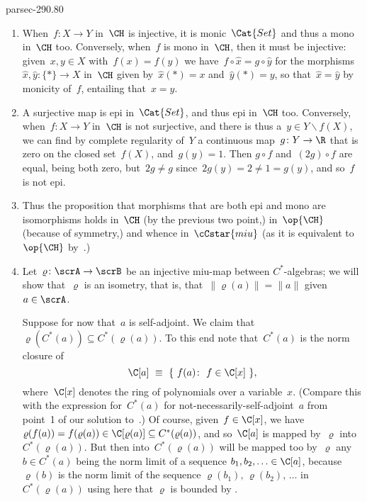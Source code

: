 \documentclass[b5page]{book}
\begin{document}
\begin{solution}{parsec-290.80}
\begin{enumerate}
\item
When~$f\colon X\to Y$ in~$\CH$ is injective,
it is monic~$\Cat{Set}$ and thus a mono in~$\CH$ too.
Conversely,
when~$f$ is mono in~$\CH$,
then it must be injective:
given~$x,y\in X$
with~$f(x)=f(y)$
we have~$f\circ \hat{x}=g\circ \hat{y}$
for the morphisms $\hat{x},\hat{y}\colon \{\ast\}\to X$
in~$\CH$
given by~$\hat{x}(\ast)=x$ and~$\hat{y}(\ast)=y$,
so that~$\hat{x}=\hat{y}$
by monicity of~$f$,
entailing that~$x=y$.
\item
A surjective map is epi in~$\Cat{Set}$, and thus epi in~$\CH$ too.
Conversely, 
when~$f\colon X\to Y$ in~$\CH$ is not surjective,
and there is thus a~$y\in Y\backslash f(X)$,
we can find by complete regularity of~$Y$
a continuous map~$g\colon Y\to \R$ 
that is zero on
the closed set~$f(X)$,
and~$g(y)=1$.
Then $g\circ f$ and~$(2g)\circ f$ are equal,
being both zero,
but~$2g\neq g$
since~$2g(y)=2\neq 1=g(y)$,
and so~$f$ is not epi.
\item
Thus the proposition
that morphisms that are both epi and mono are isomorphisms
holds
in~$\CH$ (by the previous two point,)
in~$\op{\CH}$ (because of symmetry,)
and whence in~$\cCstar{miu}$ (as
it is
equivalent to $\op{\CH}$ by~.)
\item
\label{S29VIII3}
Let~$\varrho\colon \scrA\to\scrB$
be an injective miu-map between $C^*$-algebras;
we will show that~$\varrho$ is an isometry,
that is, 
that~$\|\varrho(a)\|=\|a\|$ given~$a\in \scrA$.

Suppose for now that~$a$ is self-adjoint.
We claim that~$\varrho(C^*(a))\subseteq C^*(\varrho(a))$.
To this end note
that~$C^*(a)$
is the norm closure
of
$$\C[a]\ \equiv\  \{\ f(a)\colon \ f\in\C[x]\ \},$$
where~$\C[x]$ denotes the ring of polynomials over a variable~$x$.
(Compare this with the expression for~$C^*(a)$
for not-necessarily-self-adjoint~$a$ from 
point~1 of our solution to~.)
Of course, given~$f\in \C[x]$,
we have~$\varrho(f(a))=f(\varrho(a))\in \C[\varrho(a)]\subseteq
C^*(\varrho(a))$,
and so~$\C[a]$ is mapped by~$\varrho$ into~$C^*(\varrho(a))$.
But then into~$C^*(\varrho(a))$
will be mapped too
by~$\varrho$
any~$b\in C^*(a)$ being the norm limit
of a sequence $b_1,b_2,\dotsc\in \C[a]$,
because $\varrho(b)$
is the norm limit of
the sequence 
$\varrho(b_1),\,\varrho(b_2),\,\dotsc$ in $C^*(\varrho(a))$
using here that $\varrho$ is bounded by .


\end{enumerate}
\end{solution}
\end{document}
